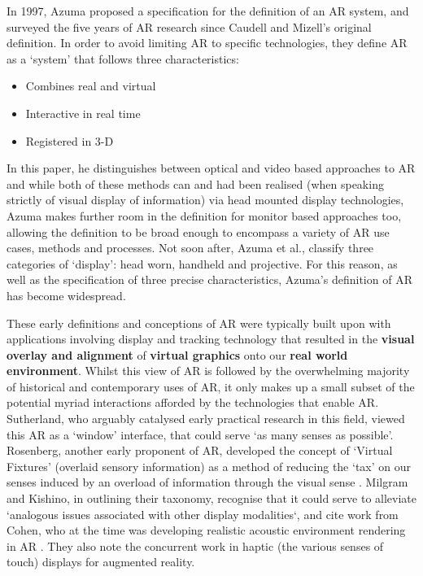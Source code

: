 In 1997, Azuma proposed a specification for the definition of an AR system, and surveyed the five years of AR research since Caudell and Mizell's original definition. In order to avoid limiting AR to specific technologies, they define AR as a `system' that follows three characteristics: 

\begin{itemize}
    \item Combines real and virtual
    \item Interactive in real time
    \item Registered in 3-D
\end{itemize}

In this paper, he distinguishes between optical and video based approaches to AR and while both of these methods can and had been realised (when speaking strictly of visual display of information) via head mounted display technologies, Azuma makes further room in the definition for monitor based approaches too, allowing the definition to be broad enough to encompass a variety of AR use cases, methods and processes. Not soon after, Azuma et al., classify three categories of `display': head worn, handheld and projective. For this reason, as well as the specification of three precise characteristics, Azuma’s definition of AR has become widespread. 

These early definitions and conceptions of AR were typically built upon with applications involving display and tracking technology that resulted in the \textbf{visual overlay and alignment} of \textbf{virtual graphics} onto our \textbf{real world environment}. Whilst this view of AR is followed by the overwhelming majority of historical and contemporary uses of AR, it only makes up a small subset of the potential myriad interactions afforded by the technologies that enable AR. Sutherland, who arguably catalysed early practical research in this field, viewed this AR as a `window' interface, that could serve `as many senses as possible'. Rosenberg, another early proponent of AR, developed the concept of `Virtual Fixtures' (overlaid sensory information) as a method of reducing the `tax' on our senses induced by an overload of information through the visual sense \citep{rosenberg1993}. Milgram and Kishino, in outlining their taxonomy, recognise that it could serve to alleviate `analogous issues associated with other display modalities`, and cite work from Cohen, who at the time was developing realistic acoustic environment rendering in AR \citeyearpar{cohen1993}. They also note the concurrent work in haptic (the various senses of touch) displays for augmented reality. 

